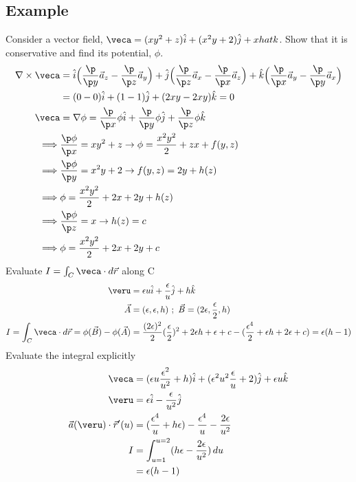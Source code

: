 \documentclass[a4paper, 11pt, normalem]{report}
\begin{document}
\subsection{Example}
Consider a vector field, $\veca = (xy^2 + z)\hat{i} + (x^2 y + 2)\hat{j} + xhat{k}$. Show that it is conservative and find its potential, $\phi$.
\begin{align*}
    \nabla \times \veca &= \hat{i}\Big(\frac{\p}{\p y}\vec{a}_z - \frac{\p}{\p z}\vec{a}_y\Big) + \hat{j}\Big(\frac{\p}{\p z}\vec{a}_x - \frac{\p}{\p x}\vec{a}_z\Big) + \hat{k}\Big(\frac{\p}{\p x}\vec{a}_y - \frac{\p}{\p y}\vec{a}_x\Big) \\
    &= (0 - 0)\hat{i} + (1 - 1)\hat{j} + (2xy - 2xy)\hat{k} = 0 \\
    \veca &= \nabla \phi = \frac{\p }{\p x}\phi \hat{i} + \frac{\p}{\p y}\phi \hat{j} + \frac{\p}{\p z}\phi \hat{k} \\
    \implies &\frac{\p \phi}{\p x} = xy^2 + z \to \phi = \frac{x^2y^2}{2} + zx + f(y,z) \\
    \implies &\frac{\p \phi}{\p y} = x^2y + 2 \to f(y,z) = 2y + h(z) \\
    \implies &\phi = \frac{x^2y^2}{2} + 2x + 2y + h(z) \\
    \implies &\frac{\p \phi}{\p z} = x \to h(z) = c \\
    \implies &\phi = \frac{x^2y^2}{2} + 2x + 2y + c
\end{align*}
Evaluate $I = \int_C \veca \cdot d\vec{r}$ along C
\begin{align*}
    \veru &= \epsilon u \hat{i} + \frac{\epsilon}{u}\hat{j} + h\hat{k} \\
    \vec{A} &= (\epsilon, \epsilon, h) ~;~ \vec{B} = (2\epsilon, \frac{\epsilon}{2}, h) \\
    I = \int_C \veca \cdot d\vec{r} = \phi(\vec{B}) - \phi(\vec{A}) &= \frac{(2\epsilon)^2}{2}(\frac{\epsilon}{2})^2 + 2\epsilon h + \epsilon + c - (\frac{\epsilon^4}{2} + \epsilon h + 2\epsilon + c) = \epsilon (h - 1)
\end{align*}
Evaluate the integral explicitly
\begin{align*}
    \veca &= (\epsilon u\frac{\epsilon^2}{u^2} + h)\hat{i} + (\epsilon^2 u^2 \frac{\epsilon}{u} + 2)\hat{j} + \epsilon u \hat{k} \\
    \veru &= \epsilon \hat{i} - \frac{\epsilon}{u^2}\hat{j} \\
    \vec{a}(\veru) \cdot \vec{r}'(u) &= (\frac{\epsilon^4}{u} + h\epsilon) - \frac{\epsilon^4}{u} - \frac{2\epsilon}{u^2} \\
    I &= \int_{u = 1}^{u = 2} (h\epsilon - \frac{2\epsilon}{u^2})\, du \\
    &= \epsilon (h - 1)
\end{align*}
\end{document}
